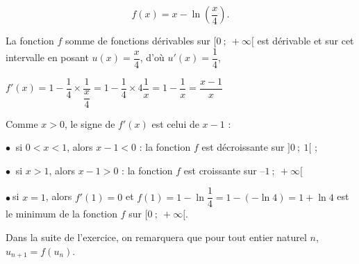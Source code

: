 \begin{enumerate}
\[ f(x) = x - \ln\left(\dfrac{x}{4}\right).\]

%	
	
	
La fonction $f$ somme de fonctions dérivables sur $[0~;~+\infty[$ est dérivable et sur cet intervalle en posant $u(x) = \dfrac x4$, d'où $u'(x) = \dfrac14$,

$f'(x) = 1 - \dfrac14 \times \dfrac{1}{\dfrac x4} = 1 - \dfrac14 \times 4 \dfrac 1x  = 1 - \dfrac 1x  = \dfrac{x - 1}{x}$

Comme $x > 0$, le signe de $f'(x)$ est celui de $x - 1$ :

$\bullet~$ si $0< x < 1$, alors $x - 1 < 0$  : la fonction $f$ est décroissante sur $]0~;~1[$ ;

$\bullet~$ si $x > 1$, alors $x - 1 > 0$ : la fonction $f$ est croissante sur $–1~;~+ \infty[$

$\bullet~$si $x = 1$, alors $f'(1) = 0$ et $f(1) = 1 - \ln \dfrac14 = 1 - (-\ln 4) = 1 + \ln 4$ est le minimum de la fonction $f$ sur $[0~;~+ \infty[$.
\end{enumerate}

Dans la suite de l'exercice, on remarquera que pour tout entier naturel $n$,\: $u_{n+1} = f\left(u_n\right)$.

